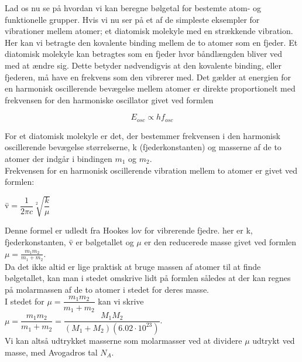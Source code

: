 Lad os nu se på hvordan vi kan beregne bølgetal for bestemte atom- og funktionelle grupper. Hvis vi nu ser på et af de simpleste eksempler for vibrationer mellem atomer; et diatomisk molekyle med en strækkende vibration. Her kan vi betragte den kovalente binding mellem de to atomer som en fjeder. Et diatomisk molekyle kan betragtes som en fjeder hvor båndlængden bliver ved med at ændre sig. Dette betyder nødvendigvis at den kovalente binding, eller fjederen, må have en frekvens som den vibrerer med. Det gælder at energien for en harmonisk oscillerende bevægelse mellem atomer er direkte proportionelt med frekvensen for den harmoniske oscillator givet ved formlen

\begin{center}
\begin{equation}
E_{osc} \propto h f_{osc}
\end{equation}
\end{center}

For et diatomisk molekyle er det, der bestemmer frekvensen i den harmonisk oscillerende bevægelse størrelserne, k (fjederkonstanten) og masserne af de to atomer der indgår i bindingen $m_1$ og $m_2$.
\\

Frekvensen for en harmonisk oscillerende vibration mellem to atomer er givet ved formlen:

\begin{center}
\={v}$= \dfrac{1}{2 \pi c} \sqrt[2]{\dfrac{k}{\mu}}$
\end{center}

Denne formel er udledt fra Hookes lov for vibrerende fjedre. her er k, fjederkonstanten, \={v} er bølgetallet og $\mu$ er den reducerede masse givet ved formlen $\mu = \frac{m_1 m_2}{m_1 + m_2}$. 
\\

Da det ikke altid er lige praktisk at bruge massen af atomer til at finde bølgetallet, kan man i stedet omskrive lidt på formlen således at der kan regnes på molarmassen af de to atomer i stedet for deres masse.
\\

I stedet for $\mu = \dfrac{m_1 m_2}{m_1 + m_2}$ kan vi skrive $\mu = \dfrac{m_1 m_2}{m_1 + m_2} = \dfrac{M_1 M_2}{(M_1 + M_2 ) (6.02 \cdot 10^{23})}$. 
\\

Vi kan altså udtrykket masserne som molarmasser ved at dividere $\mu$ udtrykt ved masse, med Avogadros tal $N_A$.
\\

